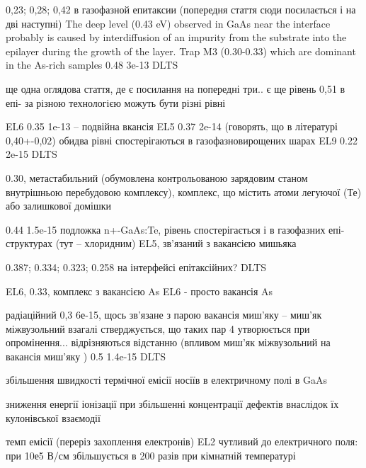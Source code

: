 \documentclass[a4paper,14pt,oneside,openany]{memoir}
\begin{document}
0,23; 0,28; 0,42 в газофазной епитаксии (попередня стаття сюди посилається і на дві наступні) \cite{Mircea1975}
The  deep  level  (0.43 eV) observed in GaAs near the interface probably is caused
by interdiffusion  of  an impurity from  the substrate into the  epilayer  during  the  growth  of the  layer. \cite{Lefevre1977}
Trap M3  (0.30-0.33)  which  are dominant  in the As-rich samples
0.48 3e-13
DLTS \cite{Lang:GaAs}

ще одна оглядова стаття, де є посилання на попередні три.. є ще рівень 0,51 \cite{Martin1977} в епі- за різною технологією можуть бути різні рівні

EL6 0.35 1e-13 -- подвійна вкансія
EL5 0.37 2e-14 (говорять, що в літературі 0,40+-0,02)
обидва рівні спостерігаються в газофазновирощених шарах
EL9 0.22 2e-15
DLTS
\cite{Fang:EL6}


0.30, метастабильний (обумовлена контрольованою зарядовим станом внутрішньою перебудовою комплексу),
комплекс, що містить атоми легуючої (Те) або залишкової домішки \cite{KolFTP1994r}

0.44 1.5e-15 подложка n+-GaAs:Te,
рівень спостерігається і в газофазних епі-структурах (тут -- хлоридним)
EL5, зв'язаний з вакансією мишьяка \cite{KolFTP1989r}

0.387; 0.334; 0.323; 0.258 на інтерфейсі епітаксійних?
DLTS
\cite{Yousefi1995}

EL6, 0.33, комплекс з вакансією As \cite{EL6:Richter}
EL6 - просто вакансія As \cite{EL6:Schultz}

радіаційний 0,3 6е-15, щось зв'язане з парою вакансія миш'яку -- миш'як міжвузольний
взагалі стверджується, що таких пар 4 утворюється при опромінення... відрізняються відстанню (впливом миш'як міжвузольний на вакансія миш'яку )
0.5 1.4e-15
DLTS
\cite{Pons}

збільшення швидкості термічної емісії носіїв в електричному полі в GaAs \cite{Bulyarskii2000r,Makram}

зниження енергії іонізації при збільшенні концентрації дефектів внаслідок їх кулонівської взаємодії \cite{Stellmacher}

темп емісії (переріз захоплення електронів) EL2 чутливий до електричного поля: при 10е5 В/см збільшується в 200 разів при кімнатній температурі \cite{Bourgoin2001}



\end{document}
